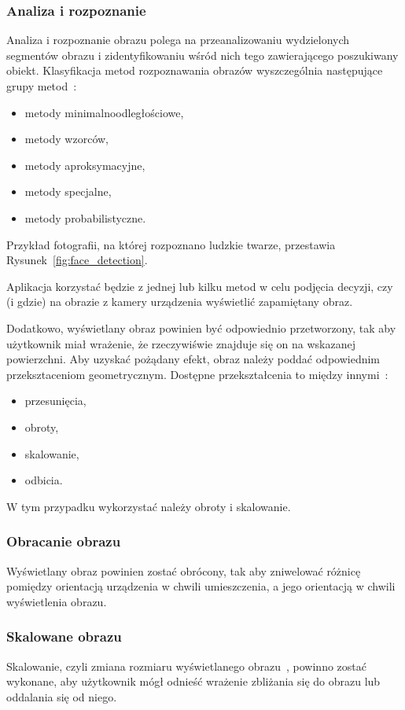 \subsubsection{Analiza i rozpoznanie}
Analiza i rozpoznanie obrazu polega na przeanalizowaniu wydzielonych segmentów obrazu i zidentyfikowaniu wśród nich tego zawierającego poszukiwany obiekt.
Klasyfikacja metod rozpoznawania obrazów wyszczególnia następujące grupy metod~\cite{roz:obr}:
\begin{itemize}
 \item metody minimalnoodległościowe,
 \item metody wzorców,
 \item metody aproksymacyjne,
 \item metody specjalne,
 \item metody probabilistyczne.
\end{itemize}

Przykład fotografii, na której rozpoznano ludzkie twarze, przestawia Rysunek~\ref{fig:face_detection}.



Aplikacja korzystać będzie z jednej lub kilku metod w celu podjęcia decyzji, czy (i gdzie) na obrazie z kamery urządzenia wyświetlić zapamiętany obraz.


Dodatkowo, wyświetlany obraz powinien być odpowiednio przetworzony, tak aby użytkownik miał wrażenie, że rzeczywiświe znajduje się on na wskazanej powierzchni.
Aby uzyskać pożądany efekt, obraz należy poddać odpowiednim przeksztaceniom geometrycznym.
Dostępne przekształcenia to między innymi~\cite{anal:przet:obr}:
\begin{itemize}
 \item przesunięcia,
 \item obroty,
 \item skalowanie,
 \item odbicia.
\end{itemize}

W tym przypadku wykorzystać należy obroty i skalowanie.

\subsubsection{Obracanie obrazu}
Wyświetlany obraz powinien zostać obrócony, tak aby zniwelować różnicę pomiędzy orientacją urządzenia w chwili umieszczenia, a jego orientacją w chwili wyświetlenia obrazu.


\subsubsection{Skalowane obrazu}
Skalowanie, czyli zmiana rozmiaru wyświetlanego obrazu~\cite{geo:tools}, powinno zostać wykonane, aby użytkownik mógł odnieść wrażenie zbliżania się do obrazu lub oddalania się od niego.

